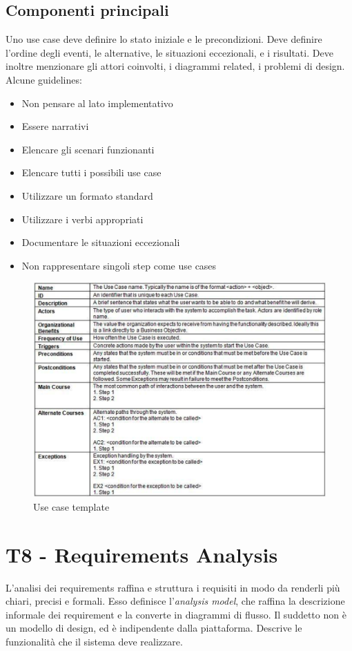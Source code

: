 \documentclass[11pt]{article}
\begin{document}
\subsection{Componenti principali}
Uno use case deve definire lo stato iniziale e le precondizioni. Deve definire l'ordine degli eventi, le alternative, le situazioni eccezionali, e i risultati. Deve inoltre menzionare gli attori coinvolti, i diagrammi related, i problemi di design. Alcune guidelines:
\begin{itemize}
    \item Non pensare al lato implementativo
    \item Essere narrativi
    \item Elencare gli scenari funzionanti
    \item Elencare tutti i possibili use case
    \item Utilizzare un formato standard
    \item Utilizzare i verbi appropriati
    \item Documentare le situazioni eccezionali
    \item Non rappresentare singoli step come use cases
\end{itemize}
\begin{figure}[H]
    \centering
    \includegraphics[width=0.8\linewidth]{res/teoria/UseCaseTemplate.png}
    \caption{Use case template}
\end{figure}

\section{T8 - Requirements Analysis}
L'analisi dei requirements raffina e struttura i requisiti in modo da renderli più chiari, precisi e formali. Esso definisce l'\textit{analysis model}, che raffina la descrizione informale dei requirement e la converte in diagrammi di flusso. Il suddetto non è un modello di design, ed è indipendente dalla piattaforma. Descrive le funzionalità che il sistema deve realizzare. 
\end{document}
